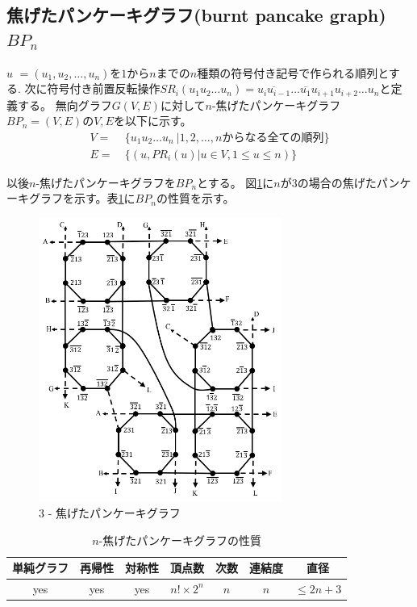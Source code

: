 \documentclass[11pt,a4j]{jsarticle}
\theoremstyle{plain}
\def\vu{\mbox{\boldmath $u$}}
\begin{document}
\newpage
\subsection{焦げたパンケーキグラフ(burnt pancake graph)$BP_n$}
{\vu} $=(u_1, u_2, \dots, u_n)$を$1$から$n$までの$n$種類の符号付き記号で作られる順列とする.
次に符号付き前置反転操作$SR_i(u_1u_2\dots u_n)=\overline{u_iu_{i-1}}\dots \overline{u_1}u_{i+1}u_{i+2}\dots u_n$と定義する。
無向グラフ$G(V,E)$に対して$n$-焦げたパンケーキグラフ $BP_n=(V,E)$の$V, E$を以下に示す。
\begin{equation*}
\begin{split}
V = ~& \{u_1u_2\dots u_n ~|1,2,\dots ,n からなる全ての順列\}\\
E = ~&\{(u,PR_i(u) | u \in V, 1 \leq u \leq n)\}
\end{split}
\end{equation*}

以後$n$-焦げたパンケーキグラフを$BP_n$とする。
図\ref{fig:3burntpancake}に$n$が3の場合の焦げたパンケーキグラフを示す。表\ref{tab:bpn_prop}に$BP_n$の性質を示す。
\begin{figure}[b]
\centering
\includegraphics[width=8cm]{burntpancake.png}
\caption{$3$ - 焦げたパンケーキグラフ}
\label{fig:3burntpancake}
\end{figure}


\begin{table}[httpb]
  \begin{center}
    \caption{$n$-焦げたパンケーキグラフの性質}
    \begin{tabular}{|c|c|c|c|c|c|c|} \hline
      単純グラフ&再帰性&対称性&頂点数&次数&連結度&直径 \\ \hline 
      yes&yes&yes&$n!\times 2^{n}$ & $n$&$n$& $ \leq 2n + 3$ \\ \hline
    \end{tabular}
        \label{tab:bpn_prop}
  \end{center}
\end{table}
\end{document}
